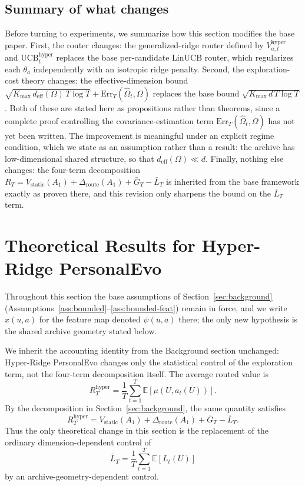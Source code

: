 \documentclass{article} %
\providecommand{\Rstatic}{V_{\mathrm{static}}}
\providecommand{\Droute}{\Delta_{\mathrm{route}}}
\providecommand{\deff}{d_{\mathrm{eff}}}
\providecommand{\Err}{\mathrm{Err}}
\providecommand{\Kmax}{K_{\max}}
\begin{document}
\subsection{Summary of what changes}

Before turning to experiments, we summarize how this section modifies the base
paper. First, the router changes: the generalized-ridge router defined by
$V_{a,t}^{\mathrm{hyper}}$ and $\mathrm{UCB}_t^{\mathrm{hyper}}$ replaces the
base per-candidate LinUCB router, which regularizes each $\theta_a$
independently with an isotropic ridge penalty. Second, the exploration-cost
theory changes: the effective-dimension bound
$\sqrt{\Kmax\, \deff(\Omega)\, T \log T} + \Err_T(\widehat{\Omega}_t, \Omega)$
replaces the base bound $\sqrt{\Kmax\, d\, T \log T}$. Both of these are
stated here as propositions rather than theorems, since a complete proof
controlling the covariance-estimation term
$\Err_T(\widehat{\Omega}_t, \Omega)$ has not yet been written. The improvement
is meaningful under an explicit regime condition, which we state as an
assumption rather than a result: the archive has low-dimensional shared
structure, so that $\deff(\Omega) \ll d$. Finally, nothing else changes: the
four-term decomposition
$R_T = \Rstatic(A_1) + \Droute(A_1) + \bar{G}_T - \bar{L}_T$ is inherited from
the base framework exactly as proven there, and this revision only sharpens
the bound on the $\bar{L}_T$ term.

\section{Theoretical Results for Hyper-Ridge PersonalEvo}
\label{sec:hyper-theory}

Throughout this section the base assumptions of Section~\ref{sec:background} (Assumptions~\ref{ass:bounded}--\ref{ass:bounded-feat}) remain in force, and we write $x(u,a)$ for the feature map denoted $\psi(u,a)$ there; the only new hypothesis is the shared archive geometry stated below.

\label{sec:theory}

We inherit the accounting identity from the Background section unchanged: Hyper-Ridge PersonalEvo changes only the statistical control of the exploration term, not the four-term decomposition itself. The average routed value is
\begin{equation}
\label{eq:hyper-routed-value}
R_T^{\mathrm{hyper}}
=
\frac{1}{T}\sum_{t=1}^{T}
\mathbb{E}\!\left[\mu(U,a_t(U))\right].
\end{equation}
By the decomposition in Section~\ref{sec:background}, the same quantity satisfies
\begin{equation}
\label{eq:hyper-inherited-decomp}
R_T^{\mathrm{hyper}}
=
V_{\mathrm{static}}(A_1)
+
\Delta_{\mathrm{route}}(A_1)
+
\bar G_T
-
\bar L_T.
\end{equation}
Thus the only theoretical change in this section is the replacement of the ordinary dimension-dependent control of
\begin{equation}
\label{eq:hyper-barl}
\bar L_T
=
\frac{1}{T}\sum_{t=1}^{T}\mathbb{E}[L_t(U)]
\end{equation}
by an archive-geometry-dependent control.
\end{document}
